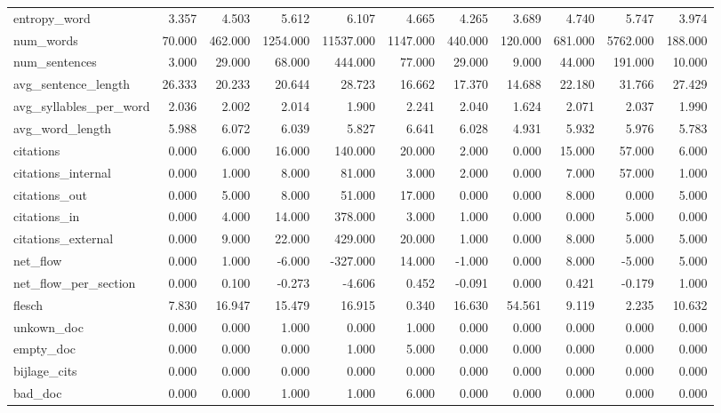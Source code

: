 \begin{tabular}{lrrrrrrrrrr}
\cline{1-11}
entropy\_word & 3.357 & 4.503 & 5.612 & 6.107 & 4.665 & 4.265 & 3.689 & 4.740 & 5.747 & 3.974 \\
\cline{1-11}
num\_words & 70.000 & 462.000 & 1254.000 & 11537.000 & 1147.000 & 440.000 & 120.000 & 681.000 & 5762.000 & 188.000 \\
\cline{1-11}
num\_sentences & 3.000 & 29.000 & 68.000 & 444.000 & 77.000 & 29.000 & 9.000 & 44.000 & 191.000 & 10.000 \\
\cline{1-11}
avg\_sentence\_length & 26.333 & 20.233 & 20.644 & 28.723 & 16.662 & 17.370 & 14.688 & 22.180 & 31.766 & 27.429 \\
\cline{1-11}
avg\_syllables\_per\_word & 2.036 & 2.002 & 2.014 & 1.900 & 2.241 & 2.040 & 1.624 & 2.071 & 2.037 & 1.990 \\
\cline{1-11}
avg\_word\_length & 5.988 & 6.072 & 6.039 & 5.827 & 6.641 & 6.028 & 4.931 & 5.932 & 5.976 & 5.783 \\
\cline{1-11}
citations & 0.000 & 6.000 & 16.000 & 140.000 & 20.000 & 2.000 & 0.000 & 15.000 & 57.000 & 6.000 \\
\cline{1-11}
citations\_internal & 0.000 & 1.000 & 8.000 & 81.000 & 3.000 & 2.000 & 0.000 & 7.000 & 57.000 & 1.000 \\
\cline{1-11}
citations\_out & 0.000 & 5.000 & 8.000 & 51.000 & 17.000 & 0.000 & 0.000 & 8.000 & 0.000 & 5.000 \\
\cline{1-11}
citations\_in & 0.000 & 4.000 & 14.000 & 378.000 & 3.000 & 1.000 & 0.000 & 0.000 & 5.000 & 0.000 \\
\cline{1-11}
citations\_external & 0.000 & 9.000 & 22.000 & 429.000 & 20.000 & 1.000 & 0.000 & 8.000 & 5.000 & 5.000 \\
\cline{1-11}
net\_flow & 0.000 & 1.000 & -6.000 & -327.000 & 14.000 & -1.000 & 0.000 & 8.000 & -5.000 & 5.000 \\
\cline{1-11}
net\_flow\_per\_section & 0.000 & 0.100 & -0.273 & -4.606 & 0.452 & -0.091 & 0.000 & 0.421 & -0.179 & 1.000 \\
\cline{1-11}
flesch & 7.830 & 16.947 & 15.479 & 16.915 & 0.340 & 16.630 & 54.561 & 9.119 & 2.235 & 10.632 \\
\cline{1-11}
unkown\_doc & 0.000 & 0.000 & 1.000 & 0.000 & 1.000 & 0.000 & 0.000 & 0.000 & 0.000 & 0.000 \\
\cline{1-11}
empty\_doc & 0.000 & 0.000 & 0.000 & 1.000 & 5.000 & 0.000 & 0.000 & 0.000 & 0.000 & 0.000 \\
\cline{1-11}
bijlage\_cits & 0.000 & 0.000 & 0.000 & 0.000 & 0.000 & 0.000 & 0.000 & 0.000 & 0.000 & 0.000 \\
\cline{1-11}
bad\_doc & 0.000 & 0.000 & 1.000 & 1.000 & 6.000 & 0.000 & 0.000 & 0.000 & 0.000 & 0.000 \\
\cline{1-11}
\bottomrule
\end{tabular}
